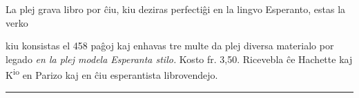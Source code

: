 
\vspace{1ex}

\leftpointright{} La plej grava libro por ĉiu, kiu deziras perfectiĝi en la lingvo Esperanto, estas la verko
\begin{center}
\end{center}

{\setlength{\parindent}{0pt} kiu konsistas el 458 paĝoj kaj enhavas tre multe da plej diversa materialo por legado \textit{en la plej modela Esperanta stilo.} Kosto fr. 3,50. Ricevebla ĉe Hachette kaj K\textsuperscript{io} en Parizo kaj en ĉiu esperantista librovendejo.}

{\centering\rule{13mm}{0.4pt}\par}
